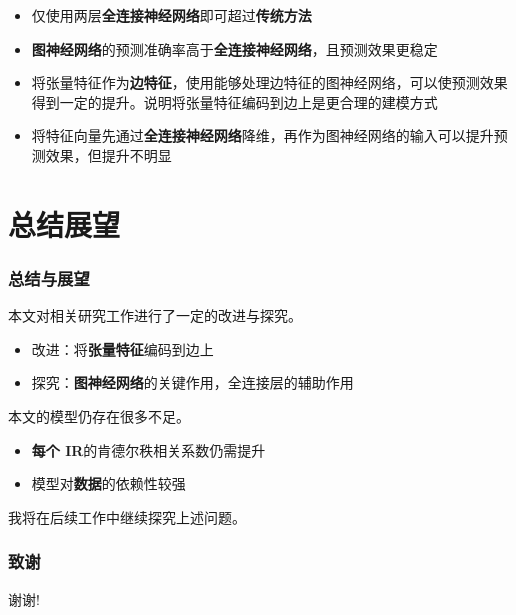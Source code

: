 \documentclass[notes=beamer]{ctexbeamer}
\begin{document}
\begin{frame}
    \begin{itemize}
      \item 仅使用两层\textbf{全连接神经网络}即可超过\textbf{传统方法}
      \item \textbf{图神经网络}的预测准确率高于\textbf{全连接神经网络}，且预测效果更稳定
      \item 将张量特征作为\textbf{边特征}，使用能够处理边特征的图神经网络，可以使预测效果得到一定的提升。说明将张量特征编码到边上是更合理的建模方式
      \item 将特征向量先通过\textbf{全连接神经网络}降维，再作为图神经网络的输入可以提升预测效果，但提升不明显
    \end{itemize}

\end{frame}

\section{总结展望}

\begin{frame}
  \frametitle{总结与展望}
  本文对相关研究工作进行了一定的改进与探究。
  \begin{itemize}
    \item 改进：将\textbf{张量特征}编码到边上
    \item 探究：\textbf{图神经网络}的关键作用，全连接层的辅助作用
  \end{itemize}
  本文的模型仍存在很多不足。
  \begin{itemize}
    \item \textbf{每个 IR}的肯德尔秩相关系数仍需提升
    \item 模型对\textbf{数据}的依赖性较强
  \end{itemize}
  我将在后续工作中继续探究上述问题。
\end{frame}

\begin{frame}
  \frametitle{致谢}
  \centerline{\Large 谢谢!}
\end{frame}
\end{document}
